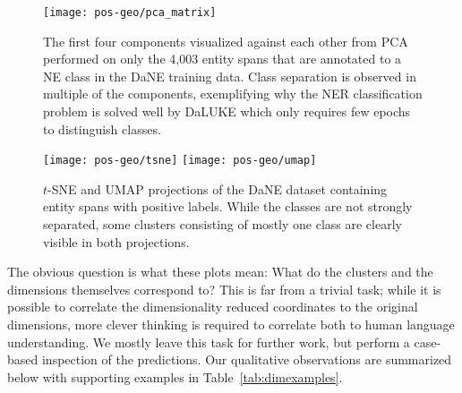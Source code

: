 \documentclass[main.tex]{subfiles}
\begin{document}
\begin{figure}[H]
    \centering
        \texttt{[image: pos-geo/pca\_matrix]}
    \caption{
        The first four components visualized against each other from PCA performed on only the 4,003 entity spans that are annotated to a NE class in the DaNE training data.
        Class separation is observed in multiple of the components, exemplifying why the NER classification problem is solved well by DaLUKE which only requires few epochs to distinguish classes.
    }
    \label{fig:pos-pca}
\end{figure}\noindent

\begin{figure}[H]
    \centering
        \texttt{[image: pos-geo/tsne]}
        \texttt{[image: pos-geo/umap]}
    \caption{
        $t$-SNE and UMAP projections of the DaNE dataset containing entity spans with positive labels.
        While the classes are not strongly separated, some clusters consisting of mostly one class are clearly visible in both projections.
    }
    \label{fig:pos-tsne}
\end{figure}\noindent
The obvious question is what these plots mean: What do the clusters and the dimensions themselves correspond to?
This is far from a trivial task; while it is possible to correlate the dimensionality reduced coordinates to the original dimensions, more clever thinking is required to correlate both to human language understanding.
We mostly leave this task for further work, but perform a case-based inspection of the predictions.
Our qualitative observations are summarized below with supporting examples in Table~\ref{tab:dimexamples}.
\end{document}
